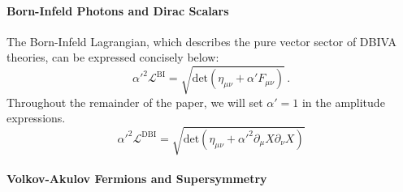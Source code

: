 \documentclass[12pt,letter]{article}
\begin{document}
\paragraph{Born-Infeld Photons and Dirac Scalars}
The Born-Infeld Lagrangian, which describes the pure vector sector of DBIVA theories, can be expressed concisely below:
\begin{equation}
 \label{biLag}
  \alpha'^2\mathcal{L}^{\text{BI}} = \sqrt{\text{det}(\eta_{\mu\nu}+\alpha' F_{\mu\nu})}\,.
\end{equation}
Throughout the remainder of the paper, we will set $\alpha'=1$ in the amplitude expressions. 
\begin{equation}
 \label{DBI}
  \alpha'^2\mathcal{L}^{\text{DBI}} = \sqrt{\text{det}(\eta_{\mu\nu}+\alpha'^2 \partial_\mu X \partial_\nu X)}
\end{equation}
\paragraph{Volkov-Akulov Fermions and Supersymmetry}
\end{document}
